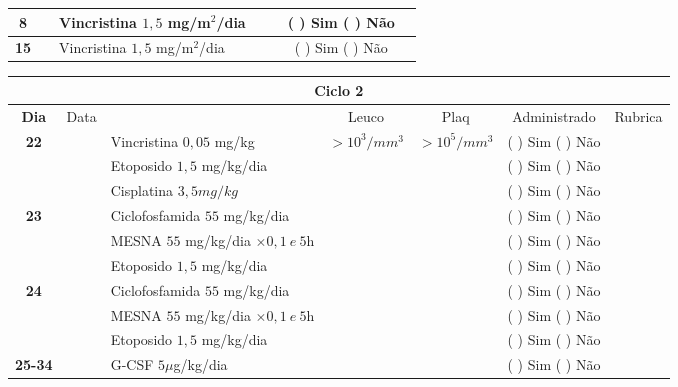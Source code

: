 \documentclass[11pt,a4paper,oldfontcommands]{memoir}
\begin{document}
\begin{center}
\begin{table}[H]
\begin{tabular}{p{1cm}c|p{4.8cm}|p{1.9cm}p{1.9cm}|c|c}
    \hline
    \multicolumn{1}{c|}{\textbf{8}}&&{Vincristina \(1,5\) mg/m\(^2\)/dia}&\multicolumn{1}{c}{}&&{(  ) Sim (  ) Não}&\\
    \hline
    \multicolumn{1}{c|}{\textbf{15}}&&{Vincristina \(1,5\) mg/m\(^2\)/dia}&\multicolumn{1}{c}{}&&{(  ) Sim (  ) Não}&\\
    \hline
\end{tabular}
\end{table}
\begin{table}[H] \small
\begin{tabular}{p{1cm}c|p{4.6cm}|p{1.4cm}p{1.4cm}|c|c}
	\hline
	\multicolumn{7}{c}{Ciclo 2} \\
	\hline
	\multicolumn{1}{c|}{\multirow{1}{*}{\textbf{Dia}}}&{Data}&{}&\multicolumn{1}{c|}{Leuco}&\multicolumn{1}{c|}{Plaq}&{Administrado}&{Rubrica} \\
    \hline
    \multicolumn{1}{c|}{\multirow{3}{*}{\textbf{22}}}&&{Vincristina \(0,05\) mg/kg}&\multicolumn{1}{c|}{\(>10^3/mm^3\)}&\multicolumn{1}{c|}{\(>10^5/mm^3\)}&{(  ) Sim (  ) Não}&\\
    \cline{4-5}
    \multicolumn{1}{c|}{}&&{Etoposido \(1,5\) mg/kg/dia}&\multicolumn{1}{c|}{}&&{(  ) Sim (  ) Não}&\\
    \cline{4-5}
    \multicolumn{1}{c|}{}&\multirow{1}{*}{}&{Cisplatina \(3,5mg/kg\)}&&&{(  ) Sim (  ) Não}&\\
    \hline
    \multicolumn{1}{c|}{\multirow{3}{*}{\textbf{23}}}&&{Ciclofosfamida \(55\) mg/kg/dia}&{}&&{(  ) Sim (  ) Não}&\\
    \multicolumn{1}{c|}{}&&{MESNA \(55\) mg/kg/dia \(\times 0,1 \:e\: 5\)h}&&&{(  ) Sim (  ) Não}&\\
    \multicolumn{1}{c|}{}&&{Etoposido \(1,5\) mg/kg/dia}&&&{(  ) Sim (  ) Não}&\\
    \hline
    \multicolumn{1}{c|}{\multirow{3}{*}{\textbf{24}}}&&{Ciclofosfamida \(55\) mg/kg/dia}&{}&&{(  ) Sim (  ) Não}&\\
    \multicolumn{1}{c|}{}&&{MESNA \(55\) mg/kg/dia \(\times 0,1 \:e\: 5\)h}&&&{(  ) Sim (  ) Não}&\\
    \multicolumn{1}{c|}{}&\multirow{1}{*}{}&{Etoposido \(1,5\) mg/kg/dia}&{}&&{(  ) Sim (  ) Não}&\\
    \hline
    \multicolumn{1}{c|}{\textbf{25-34}}&&{G-CSF \(5 \mu\)g/kg/dia }&&&{(  ) Sim (  ) Não}&\\
    \hline
\end{tabular}
\end{table}
\begin{table}[H] \small

\end{table}
\end{center}
\end{document}
